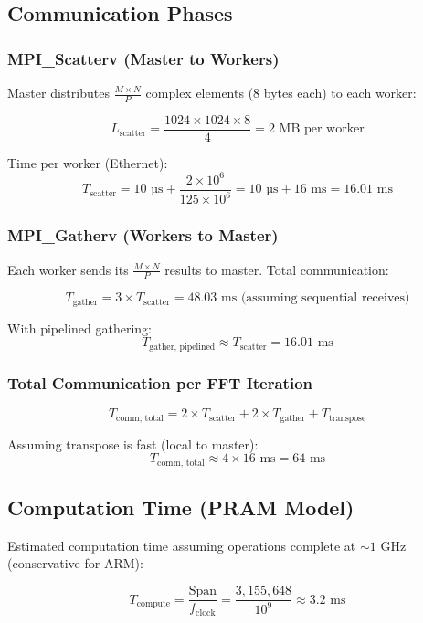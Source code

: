 \documentclass[11pt,a4paper]{article}
\theoremstyle{definition}
\begin{document}
\subsection{Communication Phases}

\subsubsection{MPI\_Scatterv (Master to Workers)}

Master distributes $\frac{M \times N}{P}$ complex elements (8 bytes each) to each worker:

\[
L_{\text{scatter}} = \frac{1024 \times 1024 \times 8}{4} = 2\text{ MB per worker}
\]

Time per worker (Ethernet):
\[
T_{\text{scatter}} = 10 \text{ µs} + \frac{2 \times 10^6}{125 \times 10^6} = 10 \text{ µs} + 16 \text{ ms} = 16.01 \text{ ms}
\]

\subsubsection{MPI\_Gatherv (Workers to Master)}

Each worker sends its $\frac{M \times N}{P}$ results to master. Total communication:

\[
T_{\text{gather}} = 3 \times T_{\text{scatter}} = 48.03 \text{ ms} \text{ (assuming sequential receives)}
\]

With pipelined gathering:
\[
T_{\text{gather, pipelined}} \approx T_{\text{scatter}} = 16.01 \text{ ms}
\]

\subsubsection{Total Communication per FFT Iteration}

\[
T_{\text{comm, total}} = 2 \times T_{\text{scatter}} + 2 \times T_{\text{gather}} + T_{\text{transpose}}
\]

Assuming transpose is fast (local to master):
\[
T_{\text{comm, total}} \approx 4 \times 16 \text{ ms} = 64 \text{ ms}
\]

\subsection{Computation Time (PRAM Model)}

Estimated computation time assuming operations complete at $\sim 1$ GHz (conservative for ARM):

\[
T_{\text{compute}} = \frac{\text{Span}}{f_{\text{clock}}} = \frac{3{,}155{,}648}{10^9} \approx 3.2 \text{ ms}
\]
\end{document}
